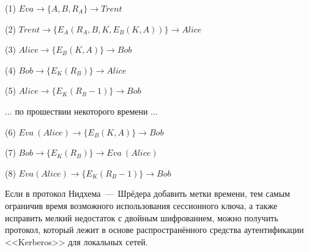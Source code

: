 \begin{protocol}
	\item[(1)] $ Eva \to \{ A, B, R_A \} \to Trent $
	\item[(2)] $ Trent \to \{ E_A \left( R_A, B, K, E_B \left( K, A \right) \right) \}	\to Alice $
	\item[(3)] $ Alice \to \{ E_B \left( K, A \right) \} \to Bob $
	\item[(4)] $ Bob \to \{ E_K \left( R_B \right) \} \to Alice $
	\item[(5)] $ Alice \to \{ E_K \left( R_B - 1 \right) \} \to Bob $
\end{protocol}
\begin{protocol}
    \item[{}]  $\dots$ по прошествии некоторого времени $\dots$
	\item[(6)] $ Eva~(Alice) \to \{ E_B \left( K, A \right) \} \to Bob $
	\item[(7)] $ Bob \to \{ E_K \left( R_B \right) \} \to Eva~(Alice) $
	\item[(8)] $ Eva (Alice) \to \{ E_K \left( R_B - 1 \right) \} \to Bob $
\end{protocol}

Если в протокол Нидхема~---~Шрёдера добавить метки времени, тем самым ограничив время возможного использования сессионного ключа, а также исправить мелкий недостаток с двойным шифрованием, можно получить протокол, который лежит в основе распространённого средства аутентификации <<Kerberos>> для локальных сетей.

